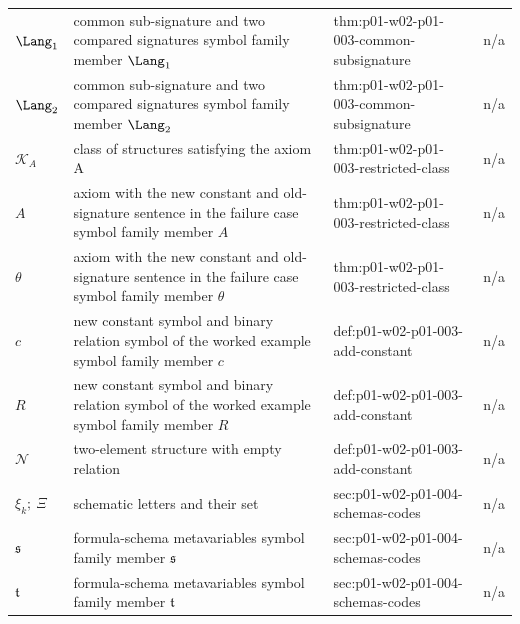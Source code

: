 \begin{longtable}{@{}p{}p{}p{}p{}@{}}
\(\Lang_1\) & common sub-signature and two compared signatures symbol family member \(\Lang_1\) & thm:\allowbreak{}p01-\allowbreak{}w02-\allowbreak{}p01-\allowbreak{}003-\allowbreak{}common-\allowbreak{}subsignature & n/a \\
\(\Lang_2\) & common sub-signature and two compared signatures symbol family member \(\Lang_2\) & thm:\allowbreak{}p01-\allowbreak{}w02-\allowbreak{}p01-\allowbreak{}003-\allowbreak{}common-\allowbreak{}subsignature & n/a \\
\(\mathcal K_A\) & class of structures satisfying the axiom A & thm:\allowbreak{}p01-\allowbreak{}w02-\allowbreak{}p01-\allowbreak{}003-\allowbreak{}restricted-\allowbreak{}class & n/a \\
\(A\) & axiom with the new constant and old-signature sentence in the failure case symbol family member \(A\) & thm:\allowbreak{}p01-\allowbreak{}w02-\allowbreak{}p01-\allowbreak{}003-\allowbreak{}restricted-\allowbreak{}class & n/a \\
\(\theta\) & axiom with the new constant and old-signature sentence in the failure case symbol family member \(\theta\) & thm:\allowbreak{}p01-\allowbreak{}w02-\allowbreak{}p01-\allowbreak{}003-\allowbreak{}restricted-\allowbreak{}class & n/a \\
\(c\) & new constant symbol and binary relation symbol of the worked example symbol family member \(c\) & def:\allowbreak{}p01-\allowbreak{}w02-\allowbreak{}p01-\allowbreak{}003-\allowbreak{}add-\allowbreak{}constant & n/a \\
\(R\) & new constant symbol and binary relation symbol of the worked example symbol family member \(R\) & def:\allowbreak{}p01-\allowbreak{}w02-\allowbreak{}p01-\allowbreak{}003-\allowbreak{}add-\allowbreak{}constant & n/a \\
\(\mathcal N\) & two-element structure with empty relation & def:\allowbreak{}p01-\allowbreak{}w02-\allowbreak{}p01-\allowbreak{}003-\allowbreak{}add-\allowbreak{}constant & n/a \\
\(\xi_k;\allowbreak \ \Xi\) & schematic letters and their set & sec:\allowbreak{}p01-\allowbreak{}w02-\allowbreak{}p01-\allowbreak{}004-\allowbreak{}schemas-\allowbreak{}codes & n/a \\
\(\mathfrak s\) & formula-schema metavariables symbol family member \(\mathfrak s\) & sec:\allowbreak{}p01-\allowbreak{}w02-\allowbreak{}p01-\allowbreak{}004-\allowbreak{}schemas-\allowbreak{}codes & n/a \\
\(\mathfrak t\) & formula-schema metavariables symbol family member \(\mathfrak t\) & sec:\allowbreak{}p01-\allowbreak{}w02-\allowbreak{}p01-\allowbreak{}004-\allowbreak{}schemas-\allowbreak{}codes & n/a \\

\end{longtable}
